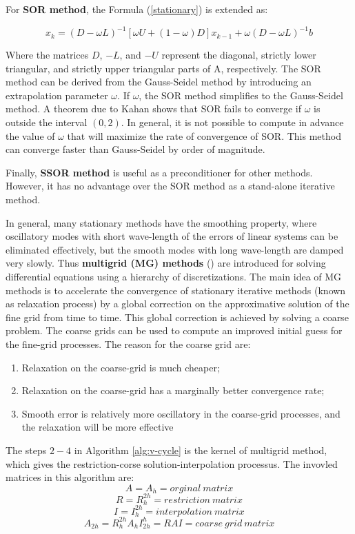 For \textbf{SOR method}, the Formula (\ref{stationary}) is extended as:

\[ x_{k}=(D-\omega L)^{-1}[\omega U+(1-\omega)D]x_{k-1}+\omega(D-\omega L)^{-1}b\]

Where the matrices $D$, $-L$, and $-U$ represent the diagonal, strictly lower triangular, and strictly upper triangular parts of A, respectively. The SOR method can be derived from the Gauss-Seidel method by introducing an extrapolation parameter $\omega$. If $\omega$, the SOR method simplifies to the Gauss-Seidel method. A theorem due to Kahan \cite{kahan1958rate} shows that SOR fails to converge if $\omega$ is outside the interval $(0,2)$. In general, it is not possible to compute in advance the value of $\omega$ that will maximize the rate of convergence of SOR. This method can converge faster than Gauss-Seidel by order of magnitude.

Finally, \textbf{SSOR method} is useful as a preconditioner for other methods. However, it has no advantage over the SOR method as a stand-alone iterative method.

In general, many stationary methods have the smoothing property, where oscillatory modes with short wave-length of the errors of linear systems can be eliminated effectively, but the smooth modes with long wave-length are damped very slowly. Thus \textbf{multigrid (MG) methods} (\cite{hutchinson1986multigrid, hiptmair1998multigrid, bank1988hierarchical}) are introduced for solving differential equations using a hierarchy of discretizations. The main idea of MG methods is to accelerate the convergence of stationary iterative methods (known as relaxation process) by a global correction on the approximative solution of the fine grid from time to time. This global correction is achieved by solving a coarse problem. The coarse grids can be used to compute an improved initial guess for the fine-grid processes. The reason for the coarse grid are:

\begin{enumerate}
	\item Relaxation on the coarse-grid is much cheaper;
	\item Relaxation on the coarse-grid has a marginally better convergence rate;
	\item Smooth error is relatively more oscillatory in the coarse-grid processes, and the relaxation will be more effective
\end{enumerate}

The steps $2-4$ in Algorithm \ref{alg:v-cycle} is the kernel of multigrid method, which gives the restriction-corse solution-interpolation processus. The invovled matrices in this algorithm are:
\[A=A_h=orginal \ matrix\]
\[R=R_h^{2h}=restriction \ matrix\]
\[I=I_h^{2h}=interpolation \ matrix\]
\[A_{2h}=R_h^{2h}A_hI_{2h}^h=RAI=coarse \ grid \ matrix\]

